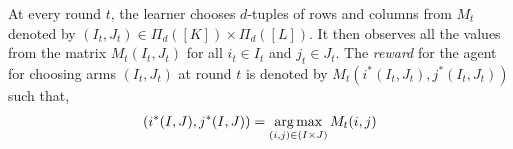 At every round $t$, the learner chooses $d$-tuples of rows and columns from $M_t$ denoted by $(I_t,J_t)\in \Pi_d([K])\times \Pi_d([L])$.   It then observes all the values from the matrix $M_{t}(I_t,J_t)$ for all $i_t\in I_t$ and $j_t \in J_t$. The \emph{reward} for the agent for choosing arms $(I_t,J_t)$ at round $t$ is denoted by $M_t(i^\ast(I_t,J_t),j^\ast(I_t,J_t))$ such that,
\begin{align}
  (i^\ast(I,J),j^\ast(I,J)) = \mathop{\rm arg\,max}_{(i,j) \in (I\times J)} M_{t}(i,j)
  \label{eq:reward}
\end{align}







